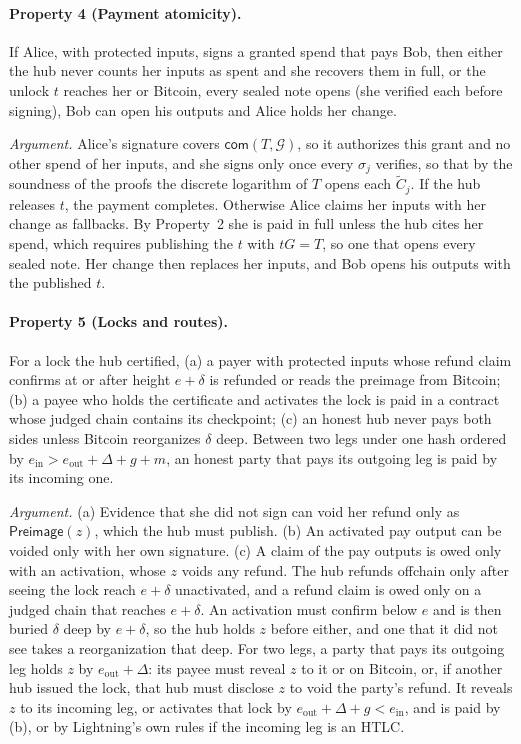\documentclass[11pt]{article}
\newcommand{\G}{\mathcal{G}}
\newcommand{\prop}[2]{\paragraph{Property #1 (#2).}}
\begin{document}
\prop{4}{Payment atomicity} If Alice, with protected inputs, signs a granted spend that pays Bob, then either the hub never counts her inputs as spent and she recovers them in full, or the unlock $t$ reaches her or Bitcoin, every sealed note opens (she verified each before signing), Bob can open his outputs and Alice holds her change.

\emph{Argument.} Alice's signature covers $\mathsf{com}(T,\G)$, so it authorizes this grant and no other spend of her inputs, and she signs only once every $\sigma_j$ verifies, so that by the soundness of the proofs the discrete logarithm of $T$ opens each $\tilde C_j$. If the hub releases $t$, the payment completes. Otherwise Alice claims her inputs with her change as fallbacks. By Property~2 she is paid in full unless the hub cites her spend, which requires publishing the $t$ with $tG=T$, so one that opens every sealed note. Her change then replaces her inputs, and Bob opens his outputs with the published $t$.

\prop{5}{Locks and routes} For a lock the hub certified, (a) a payer with protected inputs whose refund claim confirms at or after height $e+\delta$ is refunded or reads the preimage from Bitcoin; (b) a payee who holds the certificate and activates the lock is paid in a contract whose judged chain contains its checkpoint; (c) an honest hub never pays both sides unless Bitcoin reorganizes $\delta$ deep. Between two legs under one hash ordered by $e_{\mathrm{in}} > e_{\mathrm{out}} + \Delta + g + m$, an honest party that pays its outgoing leg is paid by its incoming one.

\emph{Argument.} (a) Evidence that she did not sign can void her refund only as $\mathsf{Preimage}(z)$, which the hub must publish. (b) An activated pay output can be voided only with her own signature. (c) A claim of the pay outputs is owed only with an activation, whose $z$ voids any refund. The hub refunds offchain only after seeing the lock reach $e+\delta$ unactivated, and a refund claim is owed only on a judged chain that reaches $e+\delta$. An activation must confirm below $e$ and is then buried $\delta$ deep by $e+\delta$, so the hub holds $z$ before either, and one that it did not see takes a reorganization that deep. For two legs, a party that pays its outgoing leg holds $z$ by $e_{\mathrm{out}}+\Delta$: its payee must reveal $z$ to it or on Bitcoin, or, if another hub issued the lock, that hub must disclose $z$ to void the party's refund. It reveals $z$ to its incoming leg, or activates that lock by $e_{\mathrm{out}}+\Delta+g<e_{\mathrm{in}}$, and is paid by (b), or by Lightning's own rules if the incoming leg is an HTLC.
\end{document}
